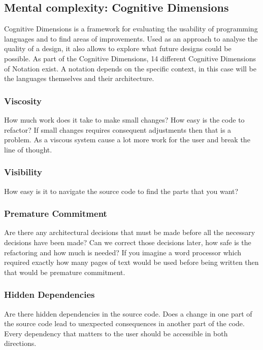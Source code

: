 \documentclass[12pt]{article}
\theoremstyle{definition}
\theoremstyle{theorem}
\begin{document}
\subsection{Mental complexity: Cognitive Dimensions}\label{cognitivedimensions}

Cognitive Dimensions is a framework for evaluating the usability of programming
languages and to find areas of improvements. Used as an approach to analyse the
quality of a design, it also allows to explore what future designs could be
possible. As part of the Cognitive Dimensions, 14 different Cognitive Dimensions
of Notation exist. A notation depends on the specific context, in this case will
be the languages themselves and their architecture.

\subsubsection{Viscosity}

How much work does it take to make small changes? How easy is the code to
refactor? If small changes requires consequent adjustments then that is a
problem. As a viscous system cause a lot more work for the user and break the
line of thought.

\subsubsection{Visibility}

How easy is it to navigate the source code to find the parts that you want?

\subsubsection{Premature Commitment}

Are there any architectural decisions that must be made before all the necessary
decisions have been made? Can we correct those decisions later, how safe is the
refactoring and how much is needed? If you imagine a word processor which
required exactly how many pages of text would be used before being written then
that would be premature commitment.

\subsubsection{Hidden Dependencies}

Are there hidden dependencies in the source code. Does a change in one part of
the source code lead to unexpected consequences in another part of the code.
Every dependency that matters to the user should be accessible in both
directions. 
\end{document}
